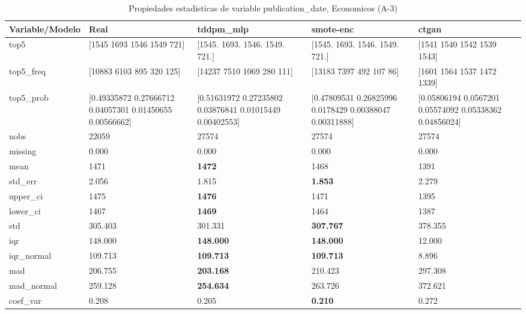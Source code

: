 \begin{table}[H]
\centering
\fontsize{8}{14}\selectfont
\caption{Propiedades  estadisticas de variable publication\_date, Economicos (A-3)}
\label{table-stats-economicos-a-3-publication_date}
\begin{tabular}{|l|m{10em}|m{10em}|m{10em}|m{10em}|}
\hline
 \rowcolor[gray]{0.8}
Variable/Modelo & Real & tddpm\_mlp & smote-enc & ctgan \\
\hline top5 & [1545 1693 1546 1549  721] & [1545. 1693. 1546. 1549.  721.] & [1545. 1693. 1546. 1549.  721.] & [1541 1540 1542 1539 1543] \\
\hline top5\_freq & [10883  6103   895   320   125] & [14237  7510  1069   280   111] & [13183  7397   492   107    86] & [1601 1564 1537 1472 1339] \\
\hline top5\_prob & [0.49335872 0.27666712 0.04057301 0.01450655 0.00566662] & [0.51631972 0.27235802 0.03876841 0.01015449 0.00402553] & [0.47809531 0.26825996 0.0178429  0.00388047 0.00311888] & [0.05806194 0.0567201  0.05574092 0.05338362 0.04856024] \\
\hline nobs & 22059 & 27574 & 27574 & 27574 \\
\hline missing & 0.000 & 0.000 & 0.000 & 0.000 \\
\hline mean & 1471 & \bfseries 1472 & 1468 & \cellcolor[rgb]{0.9, 0.54, 0.52} 1391 \\
\hline std\_err & 2.056 & \cellcolor[rgb]{0.9, 0.54, 0.52} 1.815 & \bfseries 1.853 & 2.279 \\
\hline upper\_ci & 1475 & \bfseries 1476 & 1471 & \cellcolor[rgb]{0.9, 0.54, 0.52} 1395 \\
\hline lower\_ci & 1467 & \bfseries 1469 & 1464 & \cellcolor[rgb]{0.9, 0.54, 0.52} 1387 \\
\hline std & 305.403 & 301.331 & \bfseries 307.767 & \cellcolor[rgb]{0.9, 0.54, 0.52} 378.355 \\
\hline iqr & 148.000 & \bfseries 148.000 & \bfseries 148.000 & \cellcolor[rgb]{0.9, 0.54, 0.52} 12.000 \\
\hline iqr\_normal & 109.713 & \bfseries 109.713 & \bfseries 109.713 & \cellcolor[rgb]{0.9, 0.54, 0.52} 8.896 \\
\hline mad & 206.755 & \bfseries 203.168 & 210.423 & \cellcolor[rgb]{0.9, 0.54, 0.52} 297.308 \\
\hline mad\_normal & 259.128 & \bfseries 254.634 & 263.726 & \cellcolor[rgb]{0.9, 0.54, 0.52} 372.621 \\
\hline coef\_var & 0.208 & 0.205 & \bfseries 0.210 & \cellcolor[rgb]{0.9, 0.54, 0.52} 0.272 \\

\end{tabular}
\end{table}
